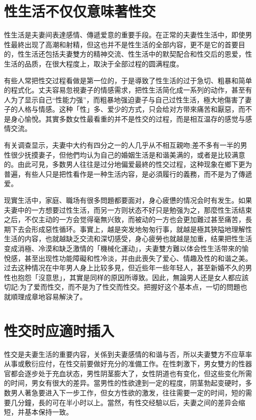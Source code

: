 \documentclass[12pt,UTF8]{ctexbook}
\begin{document}
\section{性生活不仅仅意味著性交}

性生活是夫妻间表達感情、傳遞爱意的重要手段。在正常的夫妻性生活中，即使男性最終出现了高潮和射精，但这也并不是性生活的全部内容，更不是它的首要目的，性生活还包括夫妻雙方的精神交流、性生活中的默契配合和性交后的恩爱，性生活的品质，在很大程度上，取決于全部过程的圆满程度。

有些人常把性交过程看做是第一位的，于是導致了性生活的过于急切、粗暴和简单的程式化。丈夫容易忽視妻子的情感需求，把性生活简化成一系列的动作，甚至有人为了显示自己“性能力强”，而粗暴地强迫妻子与自己过性生活，極大地傷害了妻子的人格与情感。这种「性」多、爱少的方式，只会给对方带來痛苦和厭惡，而不是身心愉悅。其實多数女性最看重的并不是性交的过程，而是相互温存的感觉与感情交流。

有关调查显示，夫妻中大约有四分之一的人几乎从不相互親吻;差不多有一半的男性很少抚摸妻子，但他們均认为自己的婚姻生活是和谐美满的，或者是比较满意的。由此可見，多数男人往往是过分地偏爱最終的性交过程，这种现象在鄉下更为普遍，有些人只是把性看作是一种生活内容，是必須履行的義務，而不是为了傳遞爱。

现實生活中，家庭、職场有很多問題都要面对，身心疲憊的情况会时有发生。如果夫妻中的一方想要过性生活，而另一方则状态不好只是勉强为之，那麼性生活结束之后，不仅主动的一方会觉得毫無兴致，而被动的一方也会更加難过甚至痛苦，長期下去会形成惡性循环。事實上，越是突发地匆匆行事，就越是極其狹隘地理解性生活的内容，也就越缺乏交流和深切感受，身心疲勞也就越是加重，结果把性生活变成消極、冷漠和缺乏激情的「機械化運动」，夫妻雙方難以体会性生活带來的愉悅感，甚至出现性功能障礙和性冷淡，并由此喪失了爱心、情趣及性的和谐之美。过去这种情况在中年男人身上比较多見，但近些年一些年轻人，甚至新婚不久的男性也抱怨「沒意思」，其實是同样的原因所導致。因此，無論男人还是女人都应該切記:为了爱而性交，而不是为了性交而性交。把握好这个基本点，一切的問題也就順理成章地容易解決了。

\section{性交时应適时插入}

性交是夫妻生活的重要内容，关係到夫妻感情的和谐与否，所以夫妻雙方不应草率从事或敷衍应付，在性交前要做好充分的准備工作。在性刺激下，男女雙方的性器官都会逐步处于充血状态，男性阴茎膨大了，女性阴道也有变化，但这些变化所需的时间，男女有很大的差异。當男性的性欲達到一定的程度，阴茎勃起变硬时，多数男人著急要进入下一步工作，但女方性欲的激发，往往需要一定的时间，短的需要几分鐘，長的可在半小时以上。當然，有性交经驗以后，夫妻之间的差异会缩短，并基本保持一致。
\end{document}
